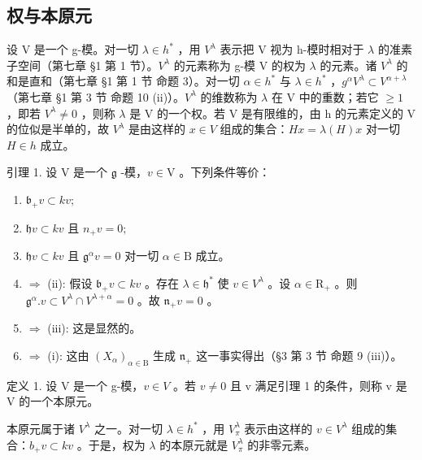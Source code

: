 \subsection{权与本原元}

设 V 是一个 g-模。对一切 \(\lambda\in h^{*}\) ，用 \(V^{\lambda}\) 表示把 V 视为 h-模时相对于 \(\lambda\) 的准素子空间（第七章 §1 第 1 节）。\(V^{\lambda}\) 的元素称为 g-模 V 的权为 \(\lambda\) 的元素。诸 \(V^{\lambda}\) 的和是直和（第七章 §1 第 1 节 命题 3）。对一切 \(\alpha\in h^{*}\) 与 \(\lambda\in h^{*}\) ，\(g^{\alpha}V^{\lambda}\subset V^{\alpha+\lambda}\) （第七章 §1 第 3 节 命题 10 (ii)）。\(V^{\lambda}\) 的维数称为 \(\lambda\) 在 V 中的重数；若它 \(\geq1\) ，即若 \(V^{\lambda}\neq0\) ，则称 \(\lambda\) 是 V 的一个权。若 V 是有限维的，由 h 的元素定义的 V 的位似是半单的，故 \(V^{\lambda}\) 是由这样的 \(x\in V\) 组成的集合：\(Hx=\lambda(H)x\) 对一切 \(H\in h\) 成立。

引理 1. 设 \(\mathrm{V}\) 是一个 \(\mathfrak{g}\) -模，\(v \in \mathrm{V}\) 。下列条件等价：

\begin{enumerate}
\def\labelenumi{(\roman{enumi})}
\item
  \(\mathfrak{b}_{+}v\subset kv;\)
\item
  \(\mathfrak{h}v \subset kv\) 且 \(n_{+}v = 0;\)
\item
  \(\mathfrak{h}v\subset kv\) 且 \(\mathfrak{g}^{\alpha}v = 0\) 对一切 \(\alpha \in \mathrm{B}\) 成立。
\item
  \(\Longrightarrow\) (ii): 假设 \(\mathfrak{b}_{+}v\subset kv\) 。存在 \(\lambda \in \mathfrak{h}^*\) 使 \(v\in V^{\lambda}\) 。设 \(\alpha \in \mathrm{R}_{+}\) 。则 \(\mathfrak{g}^{\alpha}.v\subset V^{\lambda}\cap V^{\lambda +\alpha} = 0\) 。故 \(\mathfrak{n}_{+}v = 0\) 。
\item
  \(\Longrightarrow\) (iii): 这是显然的。
\item
  \(\Longrightarrow\) (i): 这由 \((X_{\alpha})_{\alpha \in \mathrm{B}}\) 生成 \(\mathfrak{n}_{+}\) 这一事实得出（§3 第 3 节 命题 9 (iii)）。
\end{enumerate}

定义 1. 设 V 是一个 g-模，\(v \in V\) 。若 \(v \neq 0\) 且 v 满足引理 1 的条件，则称 v 是 V 的一个本原元。

本原元属于诸 \(V^{\lambda}\) 之一。对一切 \(\lambda\in h^{*}\) ，用 \(V_{\pi}^{\lambda}\) 表示由这样的 \(v\in V^{\lambda}\) 组成的集合：\(b_{+}v\subset kv\) 。于是，权为 \(\lambda\) 的本原元就是 \(V_{\pi}^{\lambda}\) 的非零元素。

